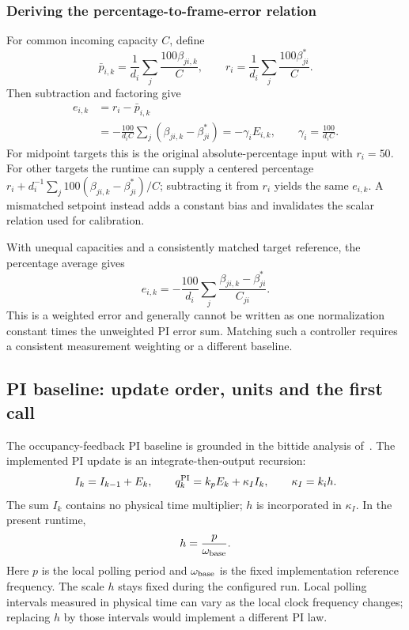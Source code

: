 \subsubsection{Deriving the percentage-to-frame-error relation}
For common incoming capacity $C$, define
\[
 \bar p_{i,k}=\frac1{d_i}\sum_j\frac{100\beta_{ji,k}}{C},\qquad
 r_i=\frac1{d_i}\sum_j\frac{100\beta^*_{ji}}{C}.
\]
Then subtraction and factoring give
\begin{align}
 e_{i,k}&=r_i-\bar p_{i,k}\\
 &=-\frac{100}{d_iC}\sum_j(\beta_{ji,k}-\beta^*_{ji})
 =-\gamma_i E_{i,k},\qquad \gamma_i=\frac{100}{d_iC}.
 \label{detail:eq:fpi_percent}
\end{align}
For midpoint targets this is the original absolute-percentage input with
$r_i=50$. For other targets the runtime can supply a centered percentage
$r_i+d_i^{-1}\sum_j100(\beta_{ji,k}-\beta^*_{ji})/C$; subtracting it from
$r_i$ yields the same $e_{i,k}$. A mismatched setpoint instead adds a
constant bias and invalidates the scalar relation used for calibration.

With unequal capacities and a consistently matched target reference, the
percentage average gives
\[
 e_{i,k}=-\frac{100}{d_i}\sum_j
 \frac{\beta_{ji,k}-\beta^*_{ji}}{C_{ji}}.
\]
This is a weighted error and generally cannot be written as one normalization constant
times the unweighted PI error sum. Matching such a controller requires a
consistent measurement weighting or a different baseline.

\subsection{PI baseline: update order, units and the first call}

The occupancy-feedback PI baseline is grounded in the bittide analysis
of~\cite{lall2022resistance}. The implemented PI update is an
integrate-then-output recursion:
\begin{equation}
 I_k=I_{k-1}+E_k,\qquad
 q_k^{\rm PI}=k_pE_k+\kappa_I I_k,\qquad \kappa_I=k_i h.
 \label{detail:eq:fpi_native}
\end{equation}
The sum $I_k$ contains no physical time multiplier; $h$ is incorporated in
$\kappa_I$. In the present runtime,
\begin{equation}
 h=\frac{p}{\omega_{\rm base}}.
 \label{detail:eq:fpd_h}
\end{equation}
Here $p$ is the local polling period and $\omega_{\rm base}$ is the fixed implementation reference frequency. The scale $h$ stays fixed during the configured run. Local polling intervals measured
in physical time can vary as the local clock frequency changes; replacing $h$ by
those intervals would implement a different PI law.

